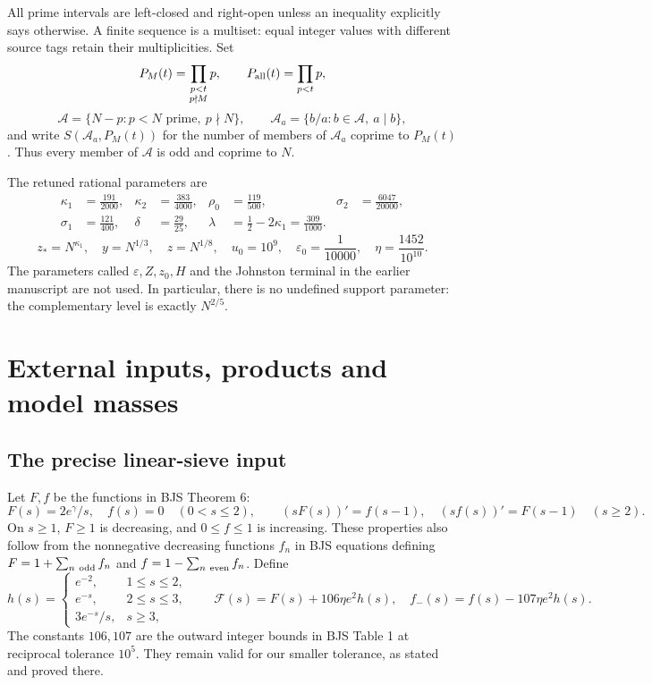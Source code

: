 \documentclass[11pt]{article}
\theoremstyle{definition}
\newcommand{\A}{\mathcal A}
\newcommand{\eps}{\varepsilon}
\newcommand{\Fup}{\mathcal F}
\begin{document}
All prime intervals are left-closed and right-open unless an inequality
explicitly says otherwise.  A finite sequence is a multiset: equal integer
values with different source tags retain their multiplicities.  Set
\[
 P_M(t)=\prod_{\substack{p<t\\p\nmid M}}p,
 \qquad P_{\rm all}(t)=\prod_{p<t}p,
\]
\[
 \A=\{N-p:p<N\text{ prime},\ p\nmid N\},\qquad
 \A_a=\{b/a:b\in\A,\ a\mid b\},
\]
and write $S(\A_a,P_M(t))$ for the number of members of $\A_a$ coprime to
$P_M(t)$.  Thus every member of $\A$ is odd and coprime to $N$.

The retuned rational parameters are
\[
\begin{aligned}
 \kappa_1&=\frac{191}{2000},&
 \kappa_2&=\frac{383}{4000},&
 \rho_0&=\frac{119}{500},&
 \sigma_2&=\frac{6047}{20000},\\
 \sigma_1&=\frac{121}{400},&
 \delta&=\frac{29}{25},&
 \lambda&=\frac12-2\kappa_1=\frac{309}{1000}.&&
\end{aligned}
\]
\[
 z_*=N^{\kappa_1},\quad y=N^{1/3},\quad z=N^{1/8},\quad
 u_0=10^9,\quad \eps_0=\frac1{10000},\quad
 \eta=\frac{1452}{10^{10}}.
\]
The parameters called $\eps,Z,z_0,H$ and the Johnston terminal in the
earlier manuscript are not used.  In particular, there is no undefined
support parameter: the complementary level is exactly $N^{2/5}$.

\section{External inputs, products and model masses}\label{sec:inputs}

\subsection{The precise linear-sieve input}

Let $F,f$ be the functions in BJS Theorem 6:
\[
 F(s)=2e^\gamma/s,\quad f(s)=0\quad(0<s\le2),\qquad
 (sF(s))'=f(s-1),\quad(sf(s))'=F(s-1)\quad(s\ge2).
\]
On $s\ge1$, $F\ge1$ is decreasing, and $0\le f\le1$ is increasing.
These properties also follow from the nonnegative decreasing functions
$f_n$ in BJS equations defining $F=1+\sum_{n\ {\rm odd}}f_n$ and
$f=1-\sum_{n\ {\rm even}}f_n$.  Define
\[
 h(s)=\begin{cases}e^{-2},&1\le s\le2,\\e^{-s},&2\le s\le3,\\
 3e^{-s}/s,&s\ge3,\end{cases}\qquad
 \Fup(s)=F(s)+106\eta e^2h(s),\quad
 f_-(s)=f(s)-107\eta e^2h(s).
\]
The constants $106,107$ are the outward integer bounds in BJS Table 1
at reciprocal tolerance $10^5$.  They remain valid for our smaller
tolerance, as stated and proved there.
\end{document}
